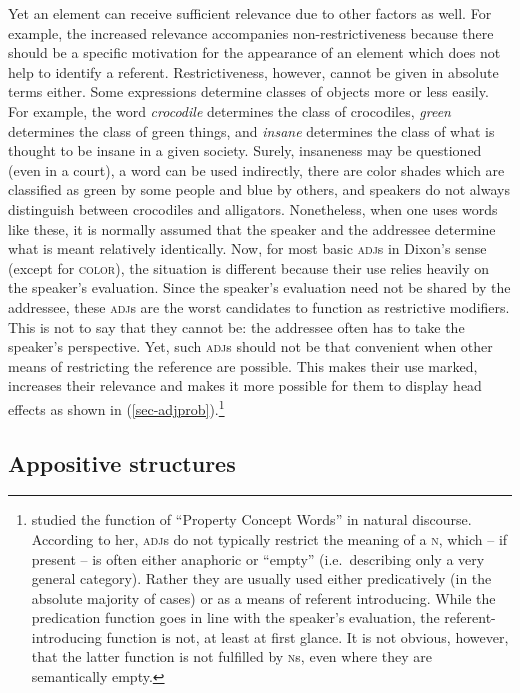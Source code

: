 \documentclass[output=paper,nobabel,draftmode  ,colorlinks, citecolor=brown]{langscibook}
\begin{document}
Yet an element can receive sufficient relevance due to other factors as well. For example, the increased relevance accompanies non-restrictiveness because there should be a specific motivation for the appearance of an element which does not help to identify a referent. Restrictiveness, however, cannot be given in absolute terms either. Some expressions determine classes of objects more or less easily. For example, the word \emph{crocodile} determines the class of crocodiles, \emph{green} determines the class of green things, and \emph{insane} determines the class of what is thought to be insane in a given society. Surely, insaneness may be questioned (even in a court), a word can be used indirectly, there are color shades which are classified as green by some people and blue by others, and speakers do not always distinguish between crocodiles and alligators. Nonetheless, when one uses words like these, it is normally assumed that the speaker and the addressee determine what is meant relatively identically. Now, for most basic \textsc{adj}s in Dixon's sense (except for \textsc{color}), the situation is different because their use relies heavily on the speaker's evaluation. Since the speaker's evaluation need not be shared by the addressee, these \textsc{adj}s are the worst candidates to function as restrictive modifiers. This is not to say that they cannot be: the addressee often has to take the speaker's perspective. Yet, such \textsc{adj}s should not be that convenient when other means of restricting the reference are possible. This makes their use marked, increases their relevance and makes it more possible for them to display head effects as shown in (\ref{sec-adjprob}).\footnote{\citet{Thompson1989} studied the function of ``Property Concept Words'' in natural discourse. According to her, \textsc{adj}s do not typically restrict the meaning of a \textsc{n}, which – if present – is often either anaphoric or ``empty'' (i.e.\ describing only a very general category). Rather they are usually used either predicatively (in the absolute majority of cases) or as a means of referent introducing. While the predication function goes in line with the speaker’s evaluation, the referent-introducing function is not, at least at first glance. It is not obvious, however, that the latter function is not fulfilled by \textsc{n}s, even where they are semantically empty.}


\subsection{Appositive structures}\label{sec-appositive}
\end{document}
